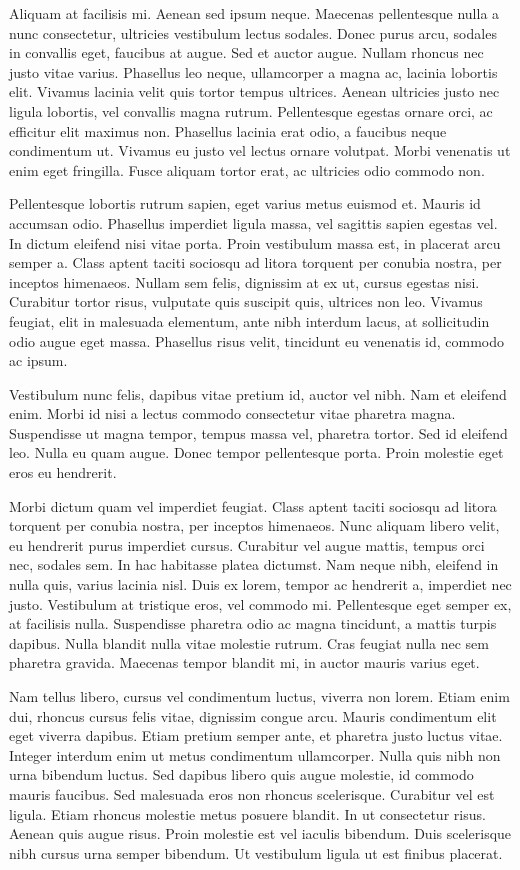 \documentclass{homework}
\begin{document}
Aliquam at facilisis mi. Aenean sed ipsum neque. Maecenas pellentesque nulla a nunc consectetur, ultricies vestibulum lectus sodales. Donec purus arcu, sodales in convallis eget, faucibus at augue. Sed et auctor augue. Nullam rhoncus nec justo vitae varius. Phasellus leo neque, ullamcorper a magna ac, lacinia lobortis elit. Vivamus lacinia velit quis tortor tempus ultrices. Aenean ultricies justo nec ligula lobortis, vel convallis magna rutrum. Pellentesque egestas ornare orci, ac efficitur elit maximus non. Phasellus lacinia erat odio, a faucibus neque condimentum ut. Vivamus eu justo vel lectus ornare volutpat. Morbi venenatis ut enim eget fringilla. Fusce aliquam tortor erat, ac ultricies odio commodo non.

Pellentesque lobortis rutrum sapien, eget varius metus euismod et. Mauris id accumsan odio. Phasellus imperdiet ligula massa, vel sagittis sapien egestas vel. In dictum eleifend nisi vitae porta. Proin vestibulum massa est, in placerat arcu semper a. Class aptent taciti sociosqu ad litora torquent per conubia nostra, per inceptos himenaeos. Nullam sem felis, dignissim at ex ut, cursus egestas nisi. Curabitur tortor risus, vulputate quis suscipit quis, ultrices non leo. Vivamus feugiat, elit in malesuada elementum, ante nibh interdum lacus, at sollicitudin odio augue eget massa. Phasellus risus velit, tincidunt eu venenatis id, commodo ac ipsum.

Vestibulum nunc felis, dapibus vitae pretium id, auctor vel nibh. Nam et eleifend enim. Morbi id nisi a lectus commodo consectetur vitae pharetra magna. Suspendisse ut magna tempor, tempus massa vel, pharetra tortor. Sed id eleifend leo. Nulla eu quam augue. Donec tempor pellentesque porta. Proin molestie eget eros eu hendrerit.

Morbi dictum quam vel imperdiet feugiat. Class aptent taciti sociosqu ad litora torquent per conubia nostra, per inceptos himenaeos. Nunc aliquam libero velit, eu hendrerit purus imperdiet cursus. Curabitur vel augue mattis, tempus orci nec, sodales sem. In hac habitasse platea dictumst. Nam neque nibh, eleifend in nulla quis, varius lacinia nisl. Duis ex lorem, tempor ac hendrerit a, imperdiet nec justo. Vestibulum at tristique eros, vel commodo mi. Pellentesque eget semper ex, at facilisis nulla. Suspendisse pharetra odio ac magna tincidunt, a mattis turpis dapibus. Nulla blandit nulla vitae molestie rutrum. Cras feugiat nulla nec sem pharetra gravida. Maecenas tempor blandit mi, in auctor mauris varius eget.

Nam tellus libero, cursus vel condimentum luctus, viverra non lorem. Etiam enim dui, rhoncus cursus felis vitae, dignissim congue arcu. Mauris condimentum elit eget viverra dapibus. Etiam pretium semper ante, et pharetra justo luctus vitae. Integer interdum enim ut metus condimentum ullamcorper. Nulla quis nibh non urna bibendum luctus. Sed dapibus libero quis augue molestie, id commodo mauris faucibus. Sed malesuada eros non rhoncus scelerisque. Curabitur vel est ligula. Etiam rhoncus molestie metus posuere blandit. In ut consectetur risus. Aenean quis augue risus. Proin molestie est vel iaculis bibendum. Duis scelerisque nibh cursus urna semper bibendum. Ut vestibulum ligula ut est finibus placerat.
\end{document}
